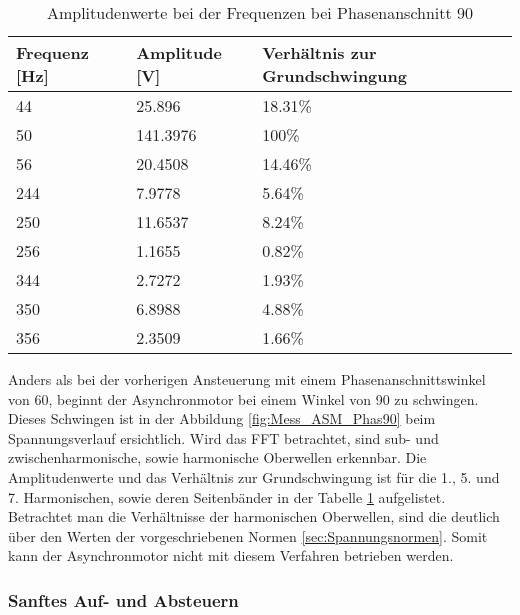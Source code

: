 \begin{table}[ht!]
	\centering
	\begin{tabular}{|l|l|l|}
		\hline
		Frequenz {[}Hz{]} & Amplitude {[}V{]} & Verhältnis zur Grundschwingung \\ \hline
		44                & 25.896            & 18.31\%                        \\ \hline
		50                & 141.3976          & 100\%                          \\ \hline
		56                & 20.4508           & 14.46\%                        \\ \hline
		244               & 7.9778            & 5.64\%                         \\ \hline
		250               & 11.6537           & 8.24\%                         \\ \hline
		256               & 1.1655            & 0.82\%                         \\ \hline
		344               & 2.7272            & 1.93\%                         \\ \hline
		350               & 6.8988            & 4.88\%                         \\ \hline
		356               & 2.3509            & 1.66\%                         \\ \hline
	\end{tabular}
\caption{Amplitudenwerte bei der Frequenzen bei Phasenanschnitt 90\textdegree}\label{tab:Mess_Spannung_ASM_Phas90}
\end{table}

Anders als bei der vorherigen Ansteuerung mit einem Phasenanschnittswinkel von 60\textdegree, beginnt der Asynchronmotor bei einem Winkel von 90\textdegree \hspace{0.02cm} zu schwingen. Dieses Schwingen ist in der Abbildung \ref{fig:Mess_ASM_Phas90} beim Spannungsverlauf ersichtlich. Wird das FFT betrachtet, sind sub- und zwischenharmonische, sowie harmonische Oberwellen erkennbar. Die Amplitudenwerte und das Verhältnis zur Grundschwingung ist für die 1., 5. und 7. Harmonischen, sowie deren Seitenbänder in der Tabelle \ref{tab:Mess_Spannung_ASM_Phas90} aufgelistet. Betrachtet man die Verhältnisse der harmonischen Oberwellen, sind die deutlich über den Werten der vorgeschriebenen Normen \ref{sec:Spannungsnormen}. Somit kann der Asynchronmotor nicht mit diesem Verfahren betrieben werden.  


\newpage
\subsubsection*{Sanftes Auf- und Absteuern}

